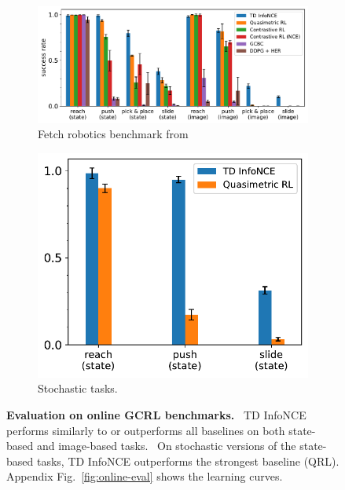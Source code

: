 \documentclass{article} %
\begin{document}
\begin{figure}[t]
    \centering
    \vspace{-1.5em}
    \begin{subfigure}[c]{0.65\textwidth}
    \centering
        \includegraphics[width=\linewidth]{figures/learning_curves/online_lc_bar_v2.pdf}
        \caption{\footnotesize Fetch robotics benchmark from~\citep{plappert2018multi}}
        \label{fig:online-eval-bar}
    \end{subfigure}
    \hfill
    \begin{subfigure}[c]{0.34\textwidth}
        \centering
        \includegraphics[width=\linewidth]{figures/learning_curves/online_noise_env_bar_v2.pdf}
        \caption{\footnotesize Stochastic tasks.}
        \label{fig:online-eval-stochastic-bar}
    \end{subfigure}
    \caption{\footnotesize \textbf{Evaluation on online GCRL benchmarks.} 
    \figleft \, TD InfoNCE performs similarly to or outperforms all baselines on both state-based and image-based tasks.
    \figright \, On stochastic versions of the state-based tasks, TD InfoNCE outperforms the strongest baseline (QRL).
    Appendix Fig.~\ref{fig:online-eval} shows the learning curves.
    }
    \vspace{-1em}
\end{figure}
\end{document}
